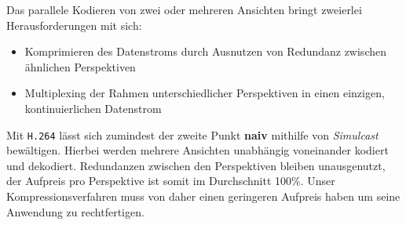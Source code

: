 Das parallele Kodieren von zwei oder mehreren Ansichten bringt zweierlei Herausforderungen mit sich:
\begin{itemize}
    \item Komprimieren des Datenstroms durch Ausnutzen von Redundanz zwischen \"ahnlichen Perspektiven
    \item Multiplexing der Rahmen unterschiedlicher Perspektiven in einen einzigen, kontinuierlichen Datenstrom
\end{itemize}

\noindent Mit \texttt{H.264} l\"asst sich zumindest der zweite Punkt \textbf{naiv} mithilfe von \textit{Simulcast}\cite{
simulcast} bew\"altigen.
Hierbei werden mehrere Ansichten unabh\"angig voneinander kodiert und dekodiert.
Redundanzen zwischen den Perspektiven bleiben unausgenutzt, der Aufpreis pro Perspektive ist somit im
Durchschnitt 100\%.
Unser Kompressionsverfahren muss von daher einen geringeren Aufpreis haben um seine Anwendung zu rechtfertigen.
